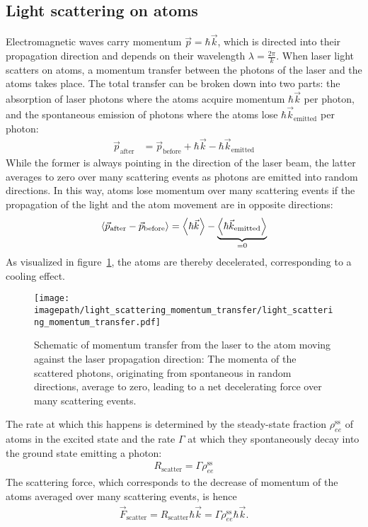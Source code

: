 \subsection*{Light scattering on atoms}
Electromagnetic waves carry momentum $\vec p = \hbar \vec k$, which is directed into their propagation direction and depends on their wavelength $\lambda = \frac{2\pi}{k}$. When laser light scatters on atoms, a momentum transfer between the photons of the laser and the atoms takes place. The total transfer can be broken down into two parts: the absorption of laser photons where the atoms acquire momentum $\hbar \vec k$ per photon, and the spontaneous emission of photons where the atoms lose $\hbar \vec k_\text{emitted}$ per photon:
\begin{align}
    \vec p_\text{after} &= \vec p_\text{before} + \hbar \vec k - \hbar \vec k_\text{emitted}
\end{align}
While the former is always pointing in the direction of the laser beam, the latter averages to zero over many scattering events as photons are emitted into random directions. In this way, atoms lose momentum over many scattering events if the propagation of the light and the atom movement are in opposite directions:
\begin{align}
    \Braket{\vec p_\text{after} - \vec p_\text{before}} = \Braket{\hbar \vec k} - \underbrace{\Braket{\hbar \vec k_\text{emitted}}}_{=0}
\end{align}
As visualized in figure~\ref{fig:light_scattering_momentum_transfer}, the atoms are thereby decelerated, corresponding to a cooling effect.

\begin{figure}    
    \centering
    \texttt{[image: \\imagepath/light\_scattering\_momentum\_transfer/light\_scattering\_momentum\_transfer.pdf]}
    \caption{Schematic of momentum transfer from the laser to the atom moving against the laser propagation direction: The momenta of the scattered photons, originating from spontaneous in random directions, average to zero, leading to a net decelerating force over many scattering events.}
    \label{fig:light_scattering_momentum_transfer}
\end{figure}

The rate at which this happens is determined by the steady-state fraction $\rho_{ee}^\text{ss}$ of atoms in the excited state and the rate $\Gamma$ at which they spontaneously decay into the ground state emitting a photon:
\begin{align}
    R_\text{scatter} = \Gamma \rho_{ee}^\text{ss}
\end{align}
The scattering force, which corresponds to the decrease of momentum of the atoms averaged over many scattering events, is hence
\begin{align}
    \vec F_\text{scatter} = R_\text{scatter} \hbar \vec k = \Gamma \rho_{ee}^\text{ss} \hbar \vec k.
\end{align}

